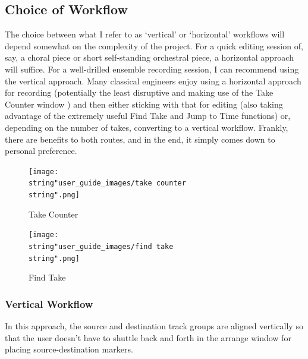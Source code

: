 \documentclass[10pt,american]{article}
\begin{document}
\subsection{Choice of Workflow}

The choice between what I refer to as `vertical' or `horizontal' workflows will
depend somewhat on the complexity of the project. For a quick editing session
of, say, a choral piece or short self-standing orchestral piece, a horizontal
approach will suffice. For a well-drilled ensemble recording session, I can
recommend using the vertical approach. Many classical engineers enjoy using a
horizontal approach for recording (potentially the least disruptive and making
use of the Take Counter window ) and then either sticking
with that for editing (also taking advantage of the extremely useful Find Take
\keys{\return} and Jump to Time \keys{\tab} functions) or, depending on the
number of takes, converting to a vertical workflow. Frankly, there are benefits
to both routes, and in the end, it simply comes down to personal preference.

\begin{figure}
\begin{centering}
\texttt{[image: \\string"user\_guide\_images/take counter\\string".png]}
\par\end{centering}
\caption{Take Counter }

\end{figure}

\begin{figure}
\begin{centering}
\texttt{[image: \\string"user\_guide\_images/find take\\string".png]}
\par\end{centering}
\caption{Find Take }

\end{figure}


\subsubsection{Vertical Workflow}

In this approach, the source and destination track groups are aligned vertically
so that the user doesn't have to shuttle back and forth in the arrange window
for placing source-destination markers. 
\end{document}
